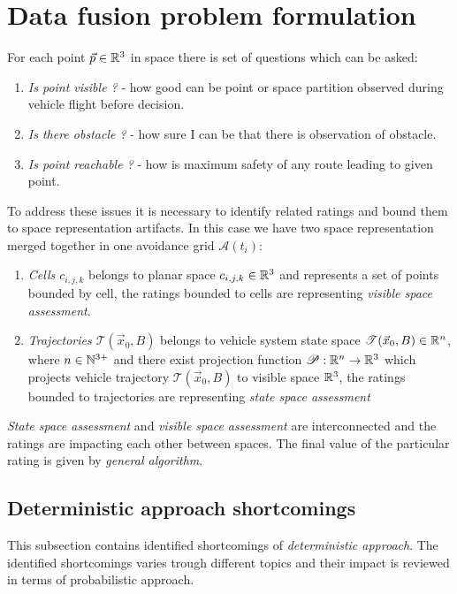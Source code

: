 \chapter{Data fusion problem formulation}\label{ch:02DataFusionProblem}
\noindent For each point $\vec{p}\in\mathbb{R}^3$ in space there is set of questions which can be asked:

\begin{enumerate}
    \item \emph{Is point visible ?} - how good can be point or space partition observed during vehicle flight before decision.
    \item \emph{Is there obstacle ?} - how sure I can be that there is observation of obstacle.
    \item \emph{Is point reachable ?} - how is maximum safety of any route leading to given point.
\end{enumerate}
\noindent To address these issues it is necessary to identify related ratings and bound them to space representation artifacts. In this case we have two space representation merged together in one avoidance grid $\mathscr{A}(t_i)$:
\begin{enumerate}
    \item\emph{Cells $c_{i,j,k}$} belongs to planar space $c_{i,j,k}\in\mathbb{R}^3$ and represents a set of points bounded by cell, the ratings bounded to cells are representing \emph{visible space assessment}.
    \item\emph{Trajectories $\mathscr{T}(\vec{x}_0,B)$} belongs to vehicle system state space $\mathscr{T}(\vec{x}_0,B)\in\mathbb{R}^n$, where $n\in\mathbb{N}^{3+}$ and there exist projection function $\mathscr{P}:\mathbb{R}^{n}\to\mathbb{R}^3$ which projects vehicle trajectory $\mathscr{T}(\vec{x}_0,B)$ to visible space $\mathbb{R}^3$, the ratings bounded to trajectories are representing \emph{state space assessment}
\end{enumerate}
\noindent \emph{State space assessment} and \emph{visible space assessment} are interconnected and the ratings are impacting each other between spaces. The final value of the particular rating is given by \emph{general algorithm}.
\section{Deterministic approach shortcomings}\label{sec:deterministicApproachShortcommings}
\noindent This subsection contains identified shortcomings of \emph{deterministic approach}. The identified shortcomings varies trough different topics and their impact is reviewed in terms of probabilistic approach.

